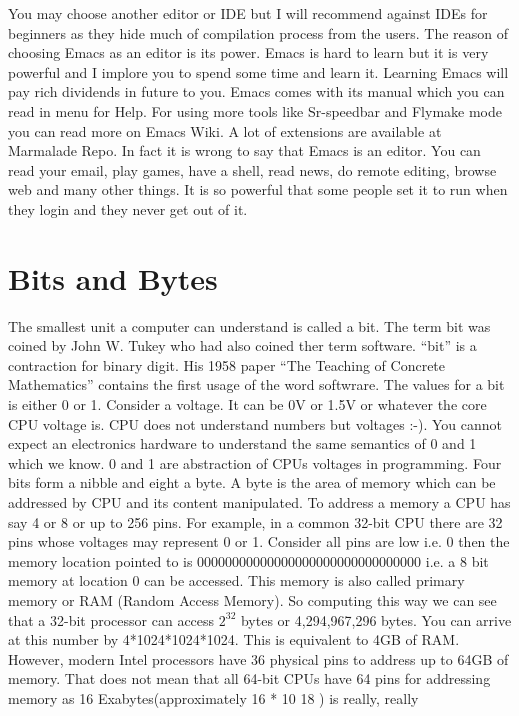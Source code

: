 You may choose another editor or IDE but I will recommend against IDEs for
beginners as they hide much of compilation process from the users. The reason
of choosing Emacs as an editor is its power. Emacs is hard to learn but it is
very powerful and I implore you to spend some time and learn it. Learning Emacs
will pay rich dividends in future to you. Emacs comes with its manual which you
can read in menu for Help. For using more tools like Sr-speedbar and Flymake
mode you can read more on Emacs Wiki. A lot of extensions are available at
Marmalade Repo. In fact it is wrong to say that Emacs is an editor. You can
read your email, play games, have a shell, read news, do remote editing, browse
web and many other things. It is so powerful that some people set it to run
when they login and they never get out of it.

\section{Bits and Bytes}
The smallest unit a computer can understand is called a bit. The term bit 
was coined by John W. Tukey who had also coined ther term software. ``bit'' 
is a contraction for binary digit. His 1958 paper ``The Teaching of Concrete 
Mathematics'' contains the first usage of the word softwrare. The values for a
bit is either 0 or 1. Consider a voltage. It can be 0V or 1.5V or whatever the
core CPU voltage is. CPU does not understand numbers but voltages :-). You
cannot expect an electronics hardware to understand the same semantics of 0 and
1 which we know. 0 and 1 are abstraction of CPUs voltages in programming. Four
bits form a nibble and eight a byte. A byte is the area of memory which
can be addressed by CPU and its content manipulated. To address a memory a CPU
has say 4 or 8 or up to 256 pins. For example, in a common 32-bit CPU there are
32 pins whose voltages may represent 0 or 1. Consider all pins are low i.e. 0
then the memory location pointed to is 00000000000000000000000000000000 i.e. a
8 bit memory at location 0 can be accessed. This memory is also called primary
memory or RAM (Random Access Memory). So computing this way we can see that a
32-bit processor can access $2^{32}$ bytes or 4,294,967,296 bytes. You can
arrive at this number by 4*1024*1024*1024. This is equivalent to 4GB of
RAM. However, modern Intel processors have 36 physical pins to address up to
64GB of memory. That does not mean that all 64-bit CPUs have 64 pins for
addressing memory as 16 Exabytes(approximately 16 * 10 18 ) is really, really
